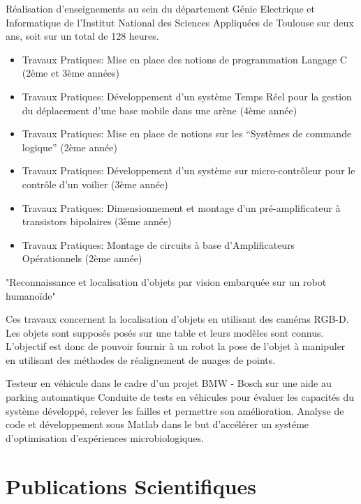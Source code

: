 \documentclass[11pt,a4paper,sans]{moderncv}         %
\begin{document}
%
{}{
  R\'ealisation d'enseignements au sein du d\'epartement G\'enie Electrique et Informatique de l'Institut National des Sciences Appliqu\'ees de Toulouse sur deux ans, soit sur un total de 128 heures.
  \begin{itemize}
    \item Travaux Pratiques: Mise en place des notions de programmation Langage C (2\`eme et 3\`eme ann\'ees)
    \item Travaux Pratiques: D\'eveloppement d'un syst\`eme Temps R\'eel pour la gestion du d\'eplacement d'une base mobile dans une ar\`ene (4\`eme ann\'ee)
    \item Travaux Pratiques: Mise en place de notions sur les ``Syst\`emes de commande logique'' (2\`eme ann\'ee)
    \item Travaux Pratiques: D\'eveloppement d'un syst\`eme sur micro-contr\^oleur pour le contr\^ole d'un voilier (3\`eme ann\'ee)
    \item Travaux Pratiques: Dimensionnement et montage d'un pr\'e-amplificateur \`a transistors bipolaires (3\`eme ann\'ee)
    \item Travaux Pratiques: Montage de circuits \`a base d'Amplificateurs Op\'erationnels (2\`eme ann\'ee)
  \end{itemize}
}
%
{"Reconnaissance et localisation d'objets par vision embarqu\'ee sur un robot humano\"ide"}{
  Ces travaux concernent la localisation d'objets en utilisant des cam\'eras RGB-D.
Les objets sont suppos\'es pos\'es sur une table et leurs mod\`eles sont connus.
L'objectif est donc de pouvoir fournir \`a un robot la pose de l'objet \`a manipuler en utilisant des m\'ethodes de r\'ealignement de nuages de points.

}
%
{Testeur en v\'ehicule dans le cadre d'un projet BMW - Bosch sur une aide au parking automatique}{
  Conduite de tests en v\'ehicules pour \'evaluer les capacit\'es du syst\`eme d\'evelopp\'e, relever les failles et permettre son am\'elioration.
}
%
{Analyse de code et d\'eveloppement sous Matlab dans le but d'acc\'el\'erer un syst\'eme d'optimisation d'exp\'eriences microbiologiques.
}

\section{Publications Scientifiques}
\end{document}
